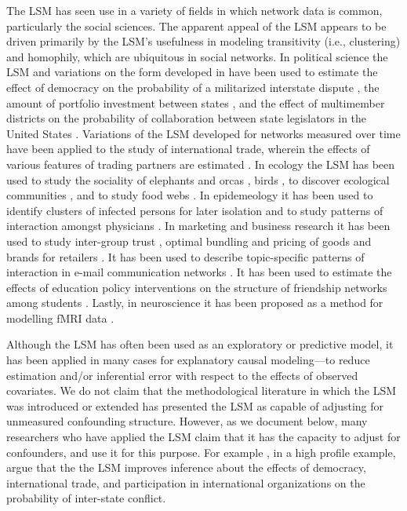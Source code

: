 \documentclass[11pt]{article}
\begin{document}
The LSM has seen use in a variety of fields in which network data is
common, particularly the social sciences. The apparent appeal of the
LSM appears to be driven primarily by the LSM's usefulness in modeling
transitivity (i.e., clustering) and homophily, which are ubiquitous in
social networks. In political science the LSM and variations on the
form developed in \cite{hoff2002latent} have been used to estimate the
effect of democracy on the probability of a militarized interstate
dispute \citep{ward2007disputes}, the amount of portfolio investment
between states \citep{cao2013democracies}, and the effect of
multimember districts on the probability of collaboration between
state legislators in the United States
\citep{kirkland2012multimember}. Variations of the LSM developed for
networks measured over time have been applied to the study of
international trade, wherein the effects of various features of
trading partners are estimated \citep{ward2013gravity}. In ecology the
LSM has been used to study the sociality of elephants
\citep{vance2009social} and orcas \citep{fearnbach2014spatial}, birds
\citep{nomano2015unrelated}, to discover ecological communities
\citep{fletcher2011social, fletcher2013network}, and to study food
webs \citep{chiu2011unifying}. In epidemeology it has been used to
identify clusters of infected persons for later isolation
\citep{zhang2015cluster} and to study patterns of interaction amongst
physicians \citep{paul2014results}. In marketing and business research
it has been used to study inter-group trust \citep{dass2011impact},
optimal bundling and pricing of goods and brands for retailers
\citep{dass2012assessing}. It has been used to describe topic-specific
patterns of interaction in e-mail communication networks
\citep{krafft2012topic}.  It has been used to estimate the effects of
education policy interventions on the structure of friendship networks
among students \citep{sweet2011modeling}. Lastly, in neuroscience it
has been proposed as a method for modelling fMRI data
\citep{simpson2013analyzing}.


Although the LSM has often been used as an exploratory or predictive
model, it has been applied in many cases for explanatory causal
modeling---to reduce estimation and/or inferential error with respect
to the effects of observed covariates. We do not claim that the
methodological literature in which the LSM was introduced or extended
has presented the LSM as capable of adjusting for unmeasured
confounding structure. However, as we document below, many researchers
who have applied the LSM claim that it has the capacity to adjust for
confounders, and use it for this purpose. For example
\citet{ward2007disputes}, in a high profile example, argue that the
the LSM improves inference about the effects of democracy,
international trade, and participation in international organizations
on the probability of inter-state conflict.
\end{document}
